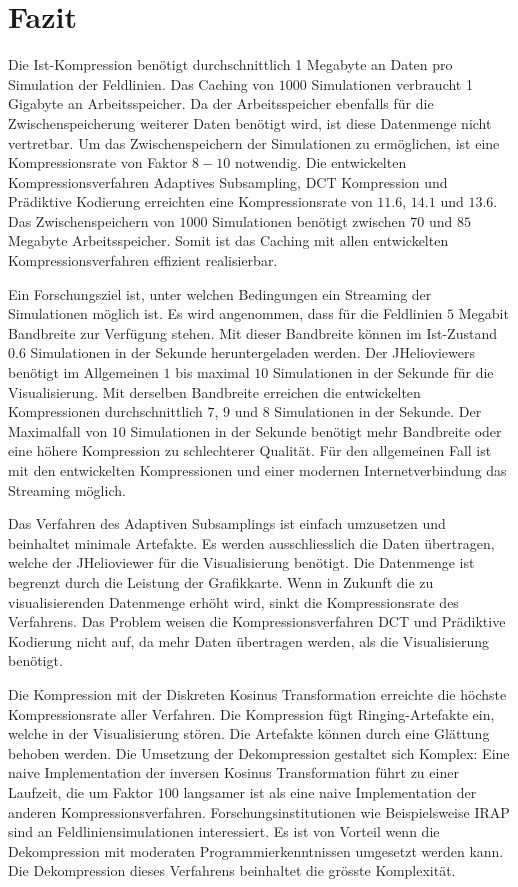\section{Fazit}
Die Ist-Kompression benötigt durchschnittlich 1 Megabyte an Daten pro Simulation der Feldlinien. Das Caching von $1000$ Simulationen verbraucht 1 Gigabyte an Arbeitsspeicher. Da der Arbeitsspeicher ebenfalls für die Zwischenspeicherung weiterer Daten benötigt wird, ist diese Datenmenge nicht vertretbar. Um das Zwischenspeichern der Simulationen zu ermöglichen, ist eine Kompressionsrate von Faktor $8-10$ notwendig. Die entwickelten Kompressionsverfahren Adaptives Subsampling, DCT Kompression und Prädiktive Kodierung erreichten eine Kompressionsrate von $11.6$, $14.1$ und $13.6$. Das Zwischenspeichern von $1000$ Simulationen benötigt zwischen $70$ und $85$ Megabyte Arbeitsspeicher. Somit ist das Caching mit allen entwickelten Kompressionsverfahren effizient realisierbar.

Ein Forschungsziel ist, unter welchen Bedingungen ein Streaming der Simulationen möglich ist. Es wird angenommen, dass für die Feldlinien $5$ Megabit Bandbreite zur Verfügung stehen. Mit dieser Bandbreite können im Ist-Zustand $0.6$ Simulationen in der Sekunde heruntergeladen werden. Der JHelioviewers benötigt im Allgemeinen $1$ bis maximal $10$ Simulationen in der Sekunde für die Visualisierung. Mit derselben Bandbreite erreichen die entwickelten Kompressionen durchschnittlich $7$, $9$ und $8$ Simulationen in der Sekunde. Der Maximalfall von $10$ Simulationen in der Sekunde benötigt mehr Bandbreite oder eine höhere Kompression zu schlechterer Qualität. Für den allgemeinen Fall ist mit den entwickelten Kompressionen und einer modernen Internetverbindung das Streaming möglich. 

Das Verfahren des Adaptiven Subsamplings ist einfach umzusetzen und beinhaltet minimale Artefakte. Es werden ausschliesslich die Daten übertragen, welche der JHelioviewer für die Visualisierung benötigt. Die Datenmenge ist begrenzt durch die Leistung der Grafikkarte. Wenn in Zukunft die zu visualisierenden Datenmenge erhöht wird, sinkt die Kompressionsrate des Verfahrens. Das Problem weisen die Kompressionsverfahren DCT und Prädiktive Kodierung nicht auf, da mehr Daten übertragen werden, als die Visualisierung benötigt.

Die Kompression mit der Diskreten Kosinus Transformation erreichte die höchste Kompressionsrate aller Verfahren. Die Kompression fügt Ringing-Artefakte ein, welche in der Visualisierung stören. Die Artefakte können durch eine Glättung behoben werden. Die Umsetzung der Dekompression gestaltet sich Komplex: Eine naive Implementation der inversen Kosinus Transformation führt zu einer Laufzeit, die um Faktor $100$ langsamer ist als eine naive Implementation der anderen Kompressionsverfahren. Forschungsinstitutionen wie Beispielsweise IRAP \cite{website:irap} sind an Feldliniensimulationen interessiert. Es ist von Vorteil wenn die Dekompression mit moderaten Programmierkenntnissen umgesetzt werden kann. Die Dekompression dieses Verfahrens beinhaltet die grösste Komplexität.

